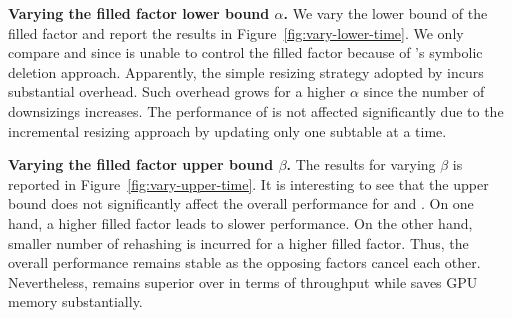 \vspace{1mm}\noindent\textbf{Varying the filled factor lower bound $\alpha$.}
We vary the lower bound of the filled factor and report the results in Figure~\ref{fig:vary-lower-time}. 
We only compare \megakv and \voter since \slab is unable to control the filled factor because of \slab's symbolic deletion approach. 
Apparently, the simple resizing strategy adopted by \megakv incurs substantial overhead. Such overhead grows for a higher $\alpha$ since the number of downsizings increases. The performance of \voter is not affected significantly due to the incremental resizing approach by updating only one subtable at a time. 



\vspace{1mm}\noindent\textbf{Varying the filled factor upper bound $\beta$.}
The results for varying $\beta$ is reported in Figure~\ref{fig:vary-upper-time}. 
It is interesting to see that the upper bound does not significantly affect the overall performance for \megakv and \voter. 
On one hand, a higher filled factor leads to slower  performance. On the other hand, smaller number of rehashing is incurred for a higher filled factor. Thus, the overall performance remains stable as the opposing factors cancel each other. Nevertheless, \voter remains superior over \megakv in terms of throughput while saves GPU memory substantially.



